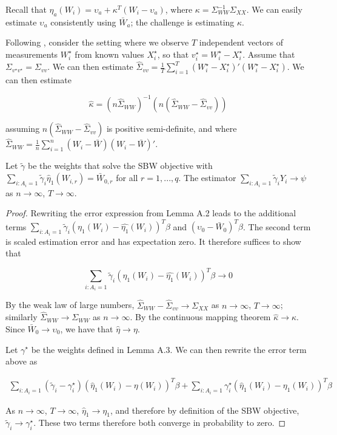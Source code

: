 Recall that $\eta_a(W_i) = \upsilon_a + \kappa^T(W_i - \upsilon_a)$, where $\kappa = \Sigma_{WW}^{-1}\Sigma_{XX}$. We can easily estimate $\upsilon_a$ consistently using $\bar{W}_a$; the challenge is estimating $\kappa$. 

Following \cite{gleser1992importance}, consider the setting where we observe $T$ independent vectors of measurements $W_i^\star$ from known values $X_i^\star$, so that $v_i^\star = W_i^\star - X_i^\star$. Assume that $\Sigma_{v^\star v^\star} = \Sigma_{vv}$. We can then estimate $\hat{\Sigma}_{vv} = \frac{1}{T}\sum_{i=1}^T(W_i^\star - X_i^\star)'(W_i^\star - X_i^\star)$. We can then estimate

$$
\hat{\kappa} = (n\hat{\Sigma}_{WW})^{-1}(n(\hat{\Sigma}_{WW} - \hat{\Sigma}_{vv}))
$$

assuming $n(\hat{\Sigma}_{WW} - \hat{\Sigma}_{vv})$ is positive semi-definite, and where $\hat{\Sigma}_{WW} = \frac{1}{n}\sum_{i=1}^n (W_i - \bar{W})(W_i - \bar{W})'$. 

\begin{proposition}
Let $\tilde{\gamma}$ be the weights that solve the SBW objective with $\sum_{i: A_i = 1}\tilde{\gamma}_i\hat{\eta}_1(W_{i, r}) = \bar{W}_{0, r}$ for all $r = 1, ..., q$. The estimator $\sum_{i: A_i = 1}\tilde{\gamma}_iY_i \to \psi$ as $n \to \infty$, $T \to \infty$.
\end{proposition}

\begin{proof}

Rewriting the error expression from Lemma A.2 leads to the additional terms $\sum_{i: A_i = 1}\tilde{\gamma}_i(\eta_1(W_i) - \hat{\eta_1}(W_i))^T\beta$ and $(\upsilon_0 - \bar{W}_0)^T\beta$. The second term is scaled estimation error and has expectation zero. It therefore suffices to show that 

$$
\sum_{i: A_i = 1}\tilde{\gamma}_i(\eta_1(W_i) - \hat{\eta_1}(W_i))^T\beta \to 0
$$

By the weak law of large numbers, $\hat{\Sigma}_{WW} - \hat{\Sigma}_{vv} \to \Sigma_{XX}$ as $n \to \infty$, $T \to \infty$; similarly $\hat{\Sigma}_{WW} \to \Sigma_{WW}$ as $n \to \infty$. By the continuous mapping theorem $\hat{\kappa} \to \kappa$. Since $\bar{W}_0 \to \upsilon_0$, we have that $\hat{\eta} \to \eta$. 

Let $\gamma^\star$ be the weights defined in Lemma A.3. We can then rewrite the error term above as

\begin{align*}
\sum_{i: A_i = 1}(\tilde{\gamma}_i - \gamma_i^\star)(\hat{\eta}_1(W_i) - \eta(W_i))^T\beta + \sum_{i: A_i = 1}\gamma_i^\star(\hat{\eta}_1(W_i) - \eta_1(W_i))^T\beta
\end{align*}

As $n \to \infty$, $T \to \infty$, $\hat{\eta}_1 \to \eta_1$, and therefore by definition of the SBW objective, $\tilde{\gamma}_i \to \gamma_i^\star$. These two terms therefore both converge in probability to zero. 

\end{proof}

